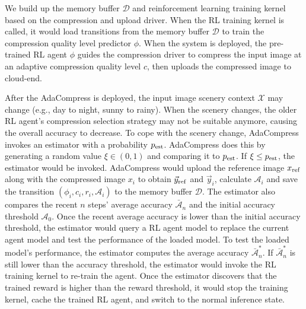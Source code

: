 
We build up the memory buffer $ \mathcal{D} $ and reinforcement learning training kernel based on the compression and upload driver. When the RL training kernel is called, it would load transitions from the memory buffer $ \mathcal{D} $ to train the compression quality level predictor $ \phi $. When the system is deployed, the pre-trained RL agent $ \phi $ guides the compression driver to compress the input image at an adaptive compression quality level $ c $, then uploads the compressed image to cloud-end. %

After the AdaCompress is deployed, the input image scenery context $ \mathcal{X} $ may change (e.g., day to night, sunny to rainy). When the scenery changes, the older RL agent's compression selection strategy may not be suitable anymore, causing the overall accuracy to decrease. To cope with the scenery change, AdaCompress invokes an estimator with a probability $ p_{\rm est} $. AdaCompress does this by generating a random value $ \xi \in (0,1) $ and comparing it to $ p_{\rm est} $. If $ \xi \leq p_{\rm est} $, the estimator would be invoked. AdaCompress would upload the reference image $ x_{\rm ref} $ along with the compressed image $ x_i $ to obtain $ \vec{y}_{\rm ref} $ and $ \vec{y}_i $, calculate $ \mathcal{A}_i $ and save the transition $ (\phi_i, c_i, r_i, \mathcal{A}_i) $ to the memory buffer $ \mathcal{D} $. The estimator also compares the recent $ n $ steps' average accuracy $ \bar{\mathcal{A}}_n $ and the initial accuracy threshold $ \mathcal{A}_0 $. Once the recent average accuracy is lower than the initial accuracy threshold, the estimator would query a RL agent model to replace the current agent model and test the performance of the loaded model. To test the loaded model's performance, the estimator computes the average accuracy $ \bar{\mathcal{A}}^*_n $. If $ \bar{\mathcal{A}}^*_n $ is still lower than the accuracy threshold, the estimator would invoke the RL training kernel to re-train the agent. Once the estimator discovers that the trained reward is higher than the reward threshold, it would stop the training kernel, cache the trained RL agent, and switch to the normal inference state. 

